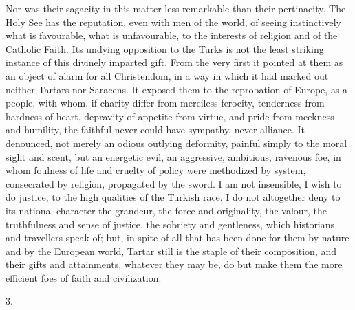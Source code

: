 Nor was their sagacity in this
matter less remarkable than their pertinacity. The Holy See has the
reputation, even with men of the world, of seeing instinctively what
is favourable, what is unfavourable, to the interests of religion and
of the Catholic Faith. Its undying opposition to the Turks is not the
least striking instance of this divinely imparted gift. From the very
first it pointed at them as an object of alarm for all Christendom, in
a way in which it had marked out neither Tartars nor Saracens. It
exposed them to the reprobation of Europe, as a people, with whom, if
charity differ from merciless ferocity, tenderness from hardness of
heart, depravity of appetite from virtue, and pride from meekness and
humility, the faithful never could have sympathy, never alliance. It
denounced, not merely an odious outlying deformity, painful simply to
the moral sight and scent, but an energetic evil, an aggressive,
ambitious, ravenous foe, in whom foulness of life and cruelty of
policy were methodized by system, consecrated by religion, propagated
by the sword. I am not insensible, I wish to do justice, to the high
qualities of the Turkish race. I do not altogether deny to its
national character the grandeur, the force and originality, the valour,
the truthfulness and sense of justice, the sobriety and gentleness,
which historians and travellers speak of; but, in spite of all that
has been done for them by nature and by the European world, Tartar
still is the staple of their composition, and their gifts and
attainments, whatever they may be, do but make them the more
efficient foes of faith and civilization.

3.

